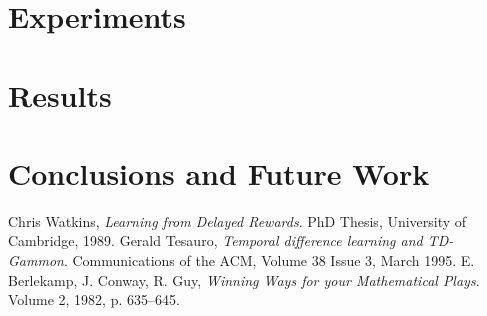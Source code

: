 \documentclass[a4paper]{article}
\begin{document}
\section{Experiments}

\section{Results}

\section{Conclusions and Future Work}

\begin{thebibliography}{9}
    Chris Watkins,
    {\em Learning from Delayed Rewards}.
    PhD Thesis, University of Cambridge, 1989.
    Gerald Tesauro,
    {\em Temporal difference learning and TD-Gammon}.
    Communications of the ACM,
    Volume 38 Issue 3, March 1995.
    E. Berlekamp, J. Conway, R. Guy,
    {\em Winning Ways for your Mathematical Plays}.
    Volume 2, 1982, p. 635--645.
\end{thebibliography}
\end{document}
